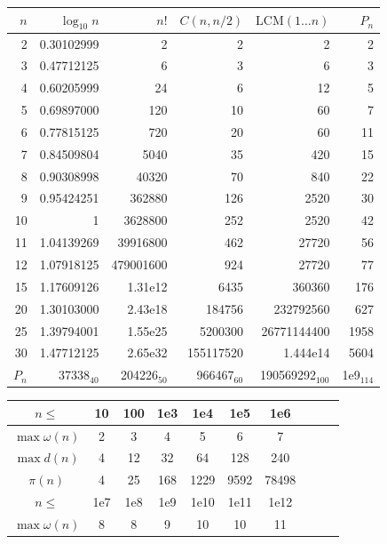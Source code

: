 \begin{table}[H]
	\centering
	\small
	\renewcommand\arraystretch{0.8}
	\begin{tabular}{|r|r|r|r|r|r|}
		\hline
		\rowcolor{black!10} $n$ & $\log_{10} n$ & $n!$ & $C(n,n/2)$ & $\mathrm{LCM}(1\dots n)$ & $P_n$\\
		\hline
		2 & 0.30102999 & 2 & 2 & 2 & 2\\
		\hline
		3 & 0.47712125 & 6 & 3 & 6 & 3\\
		\hline
		4 & 0.60205999 & 24 & 6 & 12 & 5\\
		\hline
		5 & 0.69897000 & 120 & 10 & 60 & 7\\
		\hline
		6 & 0.77815125 & 720 & 20 & 60 & 11\\
		\hline
		7 & 0.84509804 & 5040 & 35 & 420 & 15\\
		\hline
		8 & 0.90308998 & 40320 & 70 & 840 & 22\\
		\hline
		9 & 0.95424251 & 362880 & 126 & 2520 & 30\\
		\hline
		10 & 1 & 3628800 & 252  & 2520 & 42\\
		\hline
		11 & 1.04139269 & 39916800 & 462  & 27720 & 56\\
		\hline
		12 & 1.07918125 & 479001600 & 924 & 27720 & 77\\
		\hline
		15 & 1.17609126 & 1.31e{12} & 6435 & 360360 & 176\\
		\hline
		20 & 1.30103000 & 2.43e{18} & 184756 & 232792560 & 627\\
		\hline
		25 & 1.39794001 & 1.55e{25} & 5200300 & 26771144400 & 1958\\
		\hline
		30 & 1.47712125 & 2.65e{32} & 155117520 & 1.444e{14} & 5604\\
		\hline
		$P_n$ & 37338$_{40}$ & 204226$_{50}$ & 966467$_{60}$ & 190569292$_{100}$ & 1e{9}$_{114}$\\
		\hline
	\end{tabular}
	\begin{tabular}{|c|c|c|c|c|c|c|c|c|c|}
		\hline
		\rowcolor{black!10} $n \leq$ & 10 &  100 & 1e3 & 1e4 & 1e5 & 1e6 \\
		\hline
		$\max\omega(n)$ & 2 & 3 & 4 & 5 & 6 & 7  \\
		\hline
		$\max{d(n)}$ & 4 & 12 & 32 & 64 & 128 & 240 \\
		\hline
		$\pi(n)$ & 4 & 25 & 168 & 1229 & 9592 & 78498 \\
		\hline
		\rowcolor{black!10} $n \leq$ & 1e7 & 1e8 & 1e9 & 1e10 & 1e11& 1e12\\
		\hline
		$\max\omega(n)$ & 8 & 8 & 9 & 10& 10 & 11 \\

\end{tabular}
\end{table}
